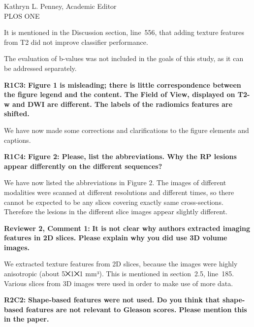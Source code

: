 \documentclass{letter}
\newenvironment{comment}[1]%
  {\vspace{5ex}\par\textbf{#1:}\ignorespaces\bfseries}%
  {\par\ignorespacesafterend}
\newenvironment{reply}%
  {\vspace{2ex}\par}%
  {\par\upshape}
\begin{document}
\begin{letter}{Kathryn L. Penney, Academic Editor \\ PLOS ONE}
\begin{reply}
It is mentioned in the Discussion section, line~556, that adding texture
features from T2 did not improve classifier performance.

The evaluation of b-values was not included in the goals of this study, as it
can be addressed separately.
\end{reply}


\begin{comment}{R1C3}
Figure 1 is misleading; there is little correspondence between the figure legend
and the content. The Field of View, displayed on T2-w and DWI are different. The
labels of the radiomics features are shifted.
\end{comment}

\begin{reply}
We have now made some corrections and clarifications to the figure elements and
captions.
\end{reply}


\begin{comment}{R1C4}
Figure 2: Please, list the abbreviations. Why the RP lesions appear differently
on the different sequences?
\end{comment}

\begin{reply}
We have now listed the abbreviations in Figure 2. The images of different
modalities were scanned at different resolutions and different times, so there
cannot be expected to be any slices covering exactly same cross-sections.
Therefore the lesions in the different slice images appear slightly different.
\end{reply}


\begin{comment}{Reviewer 2, Comment 1}
It is not clear why authors extracted imaging features in 2D slices. Please
explain why you did use 3D volume images.
\end{comment}

\begin{reply}
We extracted texture features from 2D slices, because the images were highly
anisotropic (about 5⨉1⨉1 mm³). This is mentioned in section~2.5, line~185.
Various slices from 3D images were used in order to make use of more data.
\end{reply}


\begin{comment}{R2C2}
Shape-based features were not used. Do you think that shape-based features are
not relevant to Gleason scores. Please mention this in the paper.
\end{comment}


\end{letter}
\end{document}
